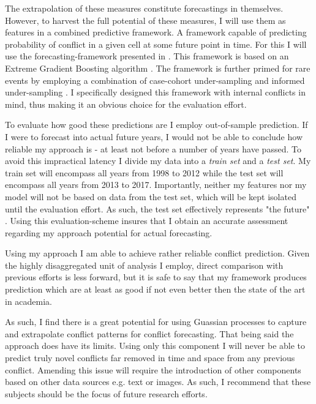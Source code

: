 \documentclass[a4paper]{article}
\begin{document}
The extrapolation of these measures constitute forecastings in themselves. However, to harvest the full potential of these measures, I will use them as features in a combined predictive framework. A framework capable of predicting probability of conflict in a given cell at some future point in time. For this I will use the forecasting-framework presented in \cite{Maase}. This framework is based on an Extreme Gradient Boosting algorithm \citep{Chen_2016}. The framework is further primed for rare events by employing a combination of case-cohort under-sampling \citep[142]{King_Zeng_2001} and informed under-sampling \cite[1267]{He_2008}. I specifically designed this framework with internal conflicts in mind, thus making it an obvious choice for the evaluation effort.\par 

To evaluate how good these predictions are I employ out-of-sample prediction. If I were to forecast into actual future years, I would not be able to conclude how reliable my approach is - at least not before a number of years have passed. To avoid this impractical latency I divide my data into a \emph{train set} and a \emph{test set}. My train set will encompass all years from 1998 to 2012 while the test set will encompass all years from 2013 to 2017. Importantly, neither my features nor my model will not be based on data from the test set, which will be kept isolated until the evaluation effort. As such, the test set effectively represents "the future" \cite[199-200]{Goldstone_2010}. Using this evaluation-scheme insures that I obtain an accurate assessment regarding my approach potential for actual forecasting.\par 

Using my approach I am able to achieve rather reliable conflict prediction. Given the highly disaggregated unit of analysis I employ, direct comparison with previous efforts is less forward, but it is safe to say that my framework produces prediction which are at least as good if not even better then the state of the art in academia.\par %

As such, I find there is a great potential for using Guassian processes to capture and extrapolate conflict patterns for conflict forecasting. That being said the approach does have its limits. Using only this component I will never be able to predict truly novel conflicts far removed in time and space from any previous conflict. Amending this issue will require the introduction of other components based on other data sources e.g. text or images. As such, I recommend that these subjects should be the focus of future research efforts.\par 
\end{document}
